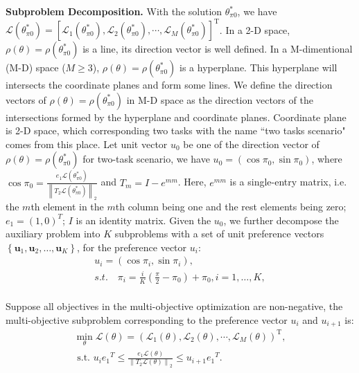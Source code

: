 \documentclass[final]{cvpr}
\begin{document}
\textbf{Subproblem Decomposition.}
With the solution $\theta_{\pi0}^*$, we have 
$\mathcal{L}(\theta_{\pi0}^*)=[\mathcal{L}_{1}(\theta_{\pi0}^*), \mathcal{L}_{2}(\theta_{\pi0}^*), \cdots, \mathcal{L}_{M}(\theta_{\pi0}^*)]^{\mathrm{T}}$.
In a 2-D space, $\rho (\theta)=\rho (\theta^*_{\pi 0})$ is a line, its direction vector is well defined. In a M-dimentional (M-D) space ($M\geq3$), $\rho (\theta)=\rho (\theta^*_{\pi 0})$ is a hyperplane. This hyperplane will intersects the coordinate planes and form some lines. We define the direction vectors of $\rho (\theta)=\rho (\theta^*_{\pi 0})$ in M-D space as the direction vectors of the intersections formed by the hyperplane and coordinate planes. Coordinate plane is 2-D space, which corresponding two tasks with the name ``two tasks scenario" comes from this place.
Let unit vector $u_0$ be one of the direction vector of $\rho(\theta) = \rho(\theta_{\pi0}^*)$ for two-task scenario, we have  $u_0 = \left(\cos \pi_{0}, \sin \pi_{0} \right)$, where $\cos \pi_0 = \frac{e_{1} \mathcal{L}(\theta_{\pi0}^*)}{\left \| T_2 \mathcal{L}(\theta_{\pi0}^*)\right \|_2}$ and $T_m = I - e^{mm}$. 
Here, $e^{mm}$ is a single-entry matrix, i.e. the $m$th element in the $m$th column being one and the rest elements being zero; $e_{1} = (1 , 0)^T$; $I$ is an identity matrix. Given the $u_0$, we further decompose the auxiliary problem into $K$ subproblems with a set of unit preference vectors  $\left\{\boldsymbol{u}_{1}, \boldsymbol{u}_{2}, \ldots, \boldsymbol{u}_{K}\right\}$, for the preference vector $u_i$:
\begin{equation}\label{ui}
\begin{array}{c}
u_i = \left(\cos \pi_{i}, \sin \pi_{i} \right), \\
s.t. \quad \pi_{i} = \frac{i}{K} \left(\frac{\pi}{2} - \pi_0 \right) + \pi_0, i = 1, \ldots, K, \\
\end{array}
\end{equation}
 
 

Suppose all objectives in the multi-objective optimization are non-negative, the multi-objective subproblem corresponding to the preference vector $u_i$ and $u_{i+1}$ is:
\begin{equation}\label{subproblem} \begin{array}{c} \min _{\theta} \mathcal{L}(\theta)=\left(\mathcal{L}_{1}(\theta), \mathcal{L}_{2}(\theta), \cdots, \mathcal{L}_{M}(\theta)\right)^{\mathrm{T}}, \\  \text { s.t. }  u_i {e_1}^T  \leq \frac{e_1 \mathcal{L}(\theta)}{\left \| T_2 \mathcal{L}(\theta) \right \|_2  }  \leq u_{i+1} {e_1}^T. %
\end{array} \end{equation} 
\end{document}
